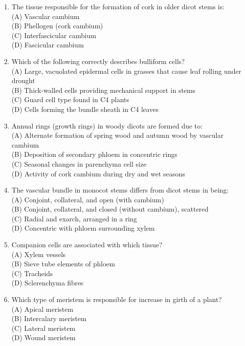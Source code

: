 \documentclass{article}
\begin{document}
\begin{enumerate}[label=Q\arabic*.]
\item The tissue responsible for the formation of cork in older dicot stems is:
\\(A) Vascular cambium
\\(B) Phellogen (cork cambium)
\\(C) Interfascicular cambium
\\(D) Fascicular cambium

\item Which of the following correctly describes bulliform cells?
\\(A) Large, vacuolated epidermal cells in grasses that cause leaf rolling under drought
\\(B) Thick-walled cells providing mechanical support in stems
\\(C) Guard cell type found in C4 plants
\\(D) Cells forming the bundle sheath in C4 leaves

\item Annual rings (growth rings) in woody dicots are formed due to:
\\(A) Alternate formation of spring wood and autumn wood by vascular cambium
\\(B) Deposition of secondary phloem in concentric rings
\\(C) Seasonal changes in parenchyma cell size
\\(D) Activity of cork cambium during dry and wet seasons

\item The vascular bundle in monocot stems differs from dicot stems in being:
\\(A) Conjoint, collateral, and open (with cambium)
\\(B) Conjoint, collateral, and closed (without cambium), scattered
\\(C) Radial and exarch, arranged in a ring
\\(D) Concentric with phloem surrounding xylem

\item Companion cells are associated with which tissue?
\\(A) Xylem vessels
\\(B) Sieve tube elements of phloem
\\(C) Tracheids
\\(D) Sclerenchyma fibres

\item Which type of meristem is responsible for increase in girth of a plant?
\\(A) Apical meristem
\\(B) Intercalary meristem
\\(C) Lateral meristem
\\(D) Wound meristem


\end{enumerate}
\end{document}
